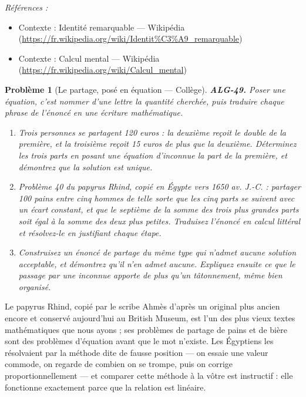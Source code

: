 \documentclass[11pt]{article}
\newtheorem{problem}{Problème}
\newenvironment{refs}{\par\small\noindent\emph{Références :}\begin{itemize}\setlength\itemsep{0pt}}{\end{itemize}\normalsize}
\begin{document}
\begin{refs}
\item Contexte : Identité remarquable --- Wikipédia (\url{https://fr.wikipedia.org/wiki/Identit%C3%A9_remarquable})
\item Contexte : Calcul mental --- Wikipédia (\url{https://fr.wikipedia.org/wiki/Calcul_mental})
\end{refs}

\bigskip

\begin{problem}[{Le partage, posé en équation --- Collège}]
\textbf{ALG-49.} Poser une équation, c'est nommer d'une lettre la quantité cherchée, puis
traduire chaque phrase de l'énoncé en une écriture mathématique.
\begin{enumerate}
\item[(a)] Trois personnes se partagent 120 euros : la deuxième reçoit le double de la première, et la
troisième reçoit 15 euros de plus que la deuxième. Déterminez les trois parts en posant une
équation d'inconnue la part de la première, et démontrez que la solution est unique.
\item[(b)] Problème 40 du papyrus Rhind, copié en Égypte vers 1650 av. J.-C. : partager 100 pains entre
cinq hommes de telle sorte que les cinq parts se suivent avec un écart constant, et que le septième
de la somme des trois plus grandes parts soit égal à la somme des deux plus petites. Traduisez
l'énoncé en calcul littéral et résolvez-le en justifiant chaque étape.
\item[(c)] Construisez un énoncé de partage du même type qui n'admet aucune solution acceptable, et
démontrez qu'il n'en admet aucune. Expliquez ensuite ce que le passage par une inconnue apporte de
plus qu'un tâtonnement, même bien organisé.
\end{enumerate}

\end{problem}

\noindent Le papyrus Rhind, copié par le scribe Ahmès d'après un original plus ancien
encore et conservé aujourd'hui au British Museum, est l'un des plus vieux textes mathématiques que
nous ayons ; ses problèmes de partage de pains et de bière sont des problèmes d'équation avant que
le mot n'existe. Les Égyptiens les résolvaient par la méthode dite de fausse position --- on essaie
une valeur commode, on regarde de combien on se trompe, puis on corrige proportionnellement --- et
comparer cette méthode à la vôtre est instructif : elle fonctionne exactement parce que la relation
est linéaire.
\end{document}
